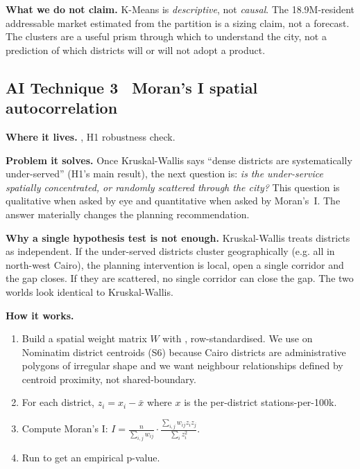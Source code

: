 \textbf{What we do not claim.} K-Means is \emph{descriptive}, not
\emph{causal}. The 18.9M-resident addressable market estimated from
the partition is a sizing claim, not a forecast. The clusters are a
useful prism through which to understand the city, not a prediction of
which districts will or will not adopt a product.

\subsection{AI Technique 3 \textbullet\ Moran's I spatial autocorrelation}

\textbf{Where it lives.} 
, H1 robustness check.

\textbf{Problem it solves.} Once Kruskal-Wallis says ``dense districts
are systematically under-served'' (H1's main result), the next question
is: \emph{is the under-service spatially concentrated, or randomly
scattered through the city?} This question is qualitative when asked
by eye and quantitative when asked by Moran's~I. The answer materially
changes the planning recommendation.

\textbf{Why a single hypothesis test is not enough.} Kruskal-Wallis
treats districts as independent. If the under-served districts cluster
geographically (e.g. all in north-west Cairo), the planning
intervention is local, open a single corridor and the gap closes. If
they are scattered, no single corridor can close the gap. The two
worlds look identical to Kruskal-Wallis.

\textbf{How it works.}
\begin{enumerate}
 \item Build a spatial weight matrix $W$ with
 , row-standardised.
 We use  on Nominatim district centroids
 (S6) because Cairo districts are administrative polygons of
 irregular shape and we want neighbour relationships defined
 by centroid proximity, not shared-boundary.
 \item For each district, $z_i = x_i - \bar{x}$ where $x$ is the
 per-district stations-per-100k.
 \item Compute Moran's I:
 $I = \frac{n}{\sum_{i,j} w_{ij}} \cdot
        \frac{\sum_{i,j} w_{ij} z_i z_j}{\sum_i z_i^2}$.
 \item Run  to get an
 empirical p-value.
\end{enumerate}

